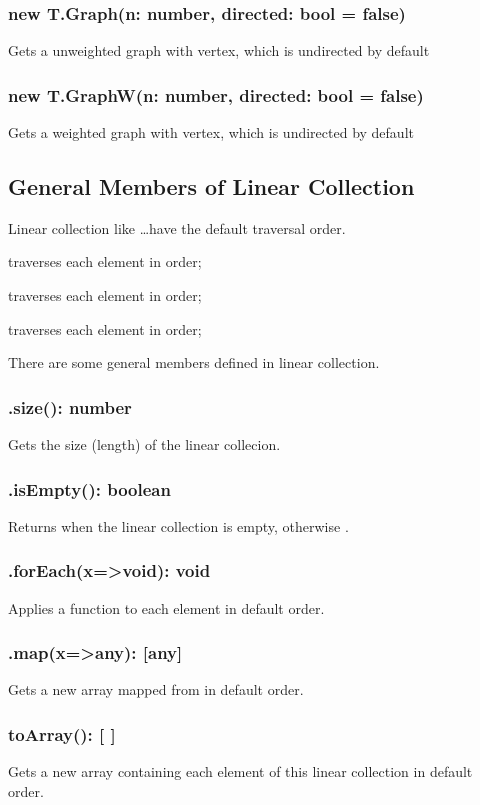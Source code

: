 \subsubsection*{new T.Graph(n: number, directed: bool = false)}
Gets a unweighted graph with  vertex, which is undirected by default
\subsubsection*{new T.GraphW(n: number, directed: bool = false)}
Gets a weighted graph with  vertex, which is undirected by default

\subsection{General Members of Linear Collection}
Linear collection like  \ldots have the default traversal order. 

 traverses each element in  order;

 traverses each element in  order;

 traverses each element in  order;

There are some general members defined in linear collection. 

\subsubsection*{.size(): number}
Gets the size (length) of the linear collecion.
\subsubsection*{.isEmpty(): boolean}
Returns  when the linear collection is empty, otherwise .
\subsubsection*{.forEach(x=>void): void}
Applies a function to each element in default order.
\subsubsection*{.map(x=>any): [any]}
Gets a new array mapped from  in default order.
\subsubsection*{toArray(): [ ]}
Gets a new array containing each element of this linear collection in default order.

